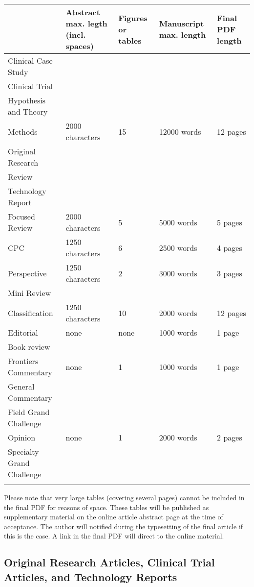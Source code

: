 \documentclass{frontiersMED} %
\begin{document}
\begin{table}[!t]
{\begin{tabular}{lllll}\toprule
 & Abstract max. legth (incl. spaces) & Figures or tables & Manuscript max. length & Final PDF length\\\midrule
Clinical Case Study & & & &\\
Clinical Trial & & & &\\
Hypothesis and Theory & & & &\\
Methods & 2000 characters  & 15 & 12000 words & 12 pages\\
Original Research & & & &\\
Review & & & &\\
Technology Report & & & &\\
Focused Review & 2000 characters & 5 & 5000 words & 5 pages\\
CPC &  1250 characters& 6 & 2500 words & 4 pages\\
Perspective & 1250 characters & 2 & 3000 words & 3 pages\\
Mini Review & & & &\\
Classification & 1250 characters & 10 & 2000 words & 12 pages\\
Editorial & none & none & 1000 words & 1 page \\
Book review & & & &\\
Frontiers Commentary & none & 1 & 1000 words & 1 page\\
General Commentary & & & &\\
Field Grand Challenge & & & &\\
Opinion & none & 1 & 2000 words & 2 pages\\
Specialty Grand Challenge& & & &\\\botrule
\end{tabular}}{}
\end{table}

Please note that very large tables (covering several pages) cannot be included in the final PDF for reasons of space. These tables will be published as supplementary material on the online article abstract page at the time of acceptance. The author will notified during the typesetting of the final article if this is the case. A link in the final PDF will direct to the online material.

\subsection{Original Research Articles, Clinical Trial Articles, and Technology Reports}
\end{document}
